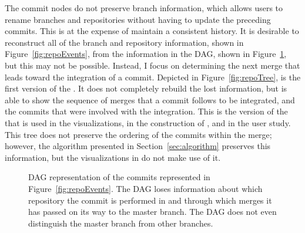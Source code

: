 The commit nodes do not preserve branch information, which allows users
to rename branches and repositories without having to update the
preceding commits.
This is at the expense of maintain a consistent history.
It is desirable to reconstruct all of the branch and repository
information, shown in Figure~\ref{fig:repoEvents}, from the information
in the DAG, shown in Figure~\ref{fig:repoDAG}, but this may not be
possible.
Instead, I focus on determining the next merge that leads
toward the integration of a commit.
Depicted in Figure~\ref{fig:repoTree}, is the first version of the \mt{}.
It does not completely rebuild the lost information, but is able to
show the sequence of merges that a commit follows to be integrated,
and the commits that were involved with the integration.
This is the version of the \mt{} that is used in the visualizations, in
the construction of \tool{}, and in the user study.
This tree does not preserve the ordering of the commits within the
merge; however, the algorithm presented in Section~\ref{sec:algorithm}
preserves this information, but the visualizations in \tool{} do not
make use of it.

\begin{figure}[htbp]
  \centering
  \caption{DAG representation of the commits represented in
    Figure~\ref{fig:repoEvents}. The DAG loses information about which
    repository the commit is performed in and through which merges it
    has passed on its way to the master branch. The DAG does not even
    distinguish the master branch from other branches.}
  \label{fig:repoDAG}
\end{figure}

